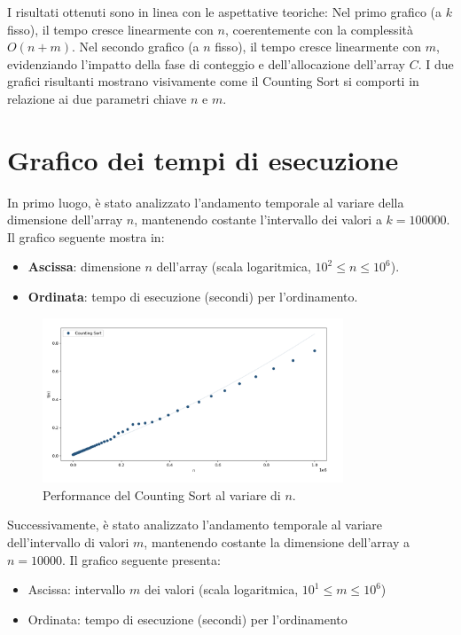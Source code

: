 \documentclass[a4paper, 12pt, oneside]{book}
\begin{document}
\noindent I risultati ottenuti sono in linea con le aspettative teoriche:
Nel primo grafico (a \(k\) fisso), il tempo cresce linearmente con \(n\), coerentemente con la complessità \(O(n + m)\).
Nel secondo grafico (a \(n\) fisso), il tempo cresce linearmente con \(m\), evidenziando l'impatto della fase di conteggio e dell'allocazione dell'array \(C\).
I due grafici risultanti mostrano visivamente come il Counting Sort si comporti in relazione ai due parametri chiave \(n\) e \(m\).

\section{Grafico dei tempi di esecuzione}

In primo luogo, è stato analizzato l'andamento temporale al variare della dimensione dell'array \(n\), mantenendo costante l'intervallo dei valori a \(k = 100000\). 
Il grafico seguente mostra in:
\begin{itemize}
    \item \textbf{Ascissa}: dimensione \(n\) dell'array (scala logaritmica, \(10^2 \leq n \leq 10^6\)).
    \item \textbf{Ordinata}: tempo di esecuzione (secondi) per l'ordinamento.
\end{itemize}

\begin{figure}[H]
    \centering
    \includegraphics[width=0.8\textwidth]{images/grafico_counting_sort_n.png}
    \caption{Performance del Counting Sort al variare di \(n\).}
    \label{fig:counting_sort_n}
\end{figure}

\noindent Successivamente, è stato analizzato l'andamento temporale al variare dell'intervallo di valori \(m\), mantenendo costante la dimensione dell'array a \(n = 10000\). 
Il grafico seguente presenta:
\begin{itemize}
    \item Ascissa: intervallo \(m\) dei valori (scala logaritmica, \(10^1 \leq m \leq 10^6\))
    \item Ordinata: tempo di esecuzione (secondi) per l'ordinamento
\end{itemize}
\end{document}
